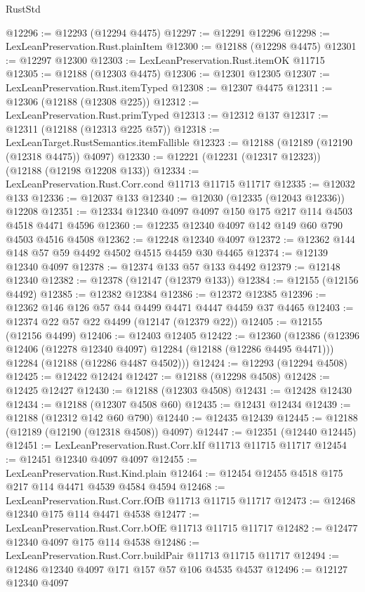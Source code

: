 \begin{lexlean}{RustStd}
\begin{coremodule}
{\begin{coremodule}
{{{{{{{{{{{{{{{{{{{{{{{{{{{{{{{{{{{{{{{{{{{{{{{{{{{{{{{{{{{{{{{{{{{{@12296 := @12293 (@12294 @4475)
@12297 := @12291 @12296
@12298 := LexLeanPreservation.Rust.plainItem
@12300 := @12188 (@12298 @4475)
@12301 := @12297 @12300
@12303 := LexLeanPreservation.Rust.itemOK @11715
@12305 := @12188 (@12303 @4475)
@12306 := @12301 @12305
@12307 := LexLeanPreservation.Rust.itemTyped
@12308 := @12307 @4475
@12311 := @12306 (@12188 (@12308 @225))
@12312 := LexLeanPreservation.Rust.primTyped
@12313 := @12312 @137
@12317 := @12311 (@12188 (@12313 @225 @57))
@12318 := LexLeanTarget.RustSemantics.itemFallible
@12323 := @12188 (@12189 (@12190 (@12318 @4475)) @4097)
@12330 := @12221 (@12231 (@12317 @12323)) (@12188 (@12198 @12208 @133))
@12334 := LexLeanPreservation.Rust.Corr.cond @11713 @11715 @11717
@12335 := @12032 @133
@12336 := @12037 @133
@12340 := @12030 (@12335 (@12043 @12336)) @12208
@12351 := @12334 @12340 @4097 @4097 @150 @175 @217 @114 @4503 @4518 @4471 @4596
@12360 := @12235 @12340 @4097 @142 @149 @60 @790 @4503 @4516 @4508
@12362 := @12248 @12340 @4097
@12372 := @12362 @144 @148 @57 @59 @4492 @4502 @4515 @4459 @30 @4465
@12374 := @12139 @12340 @4097
@12378 := @12374 @133 @57 @133 @4492
@12379 := @12148 @12340
@12382 := @12378 (@12147 (@12379 @133))
@12384 := @12155 (@12156 @4492)
@12385 := @12382 @12384
@12386 := @12372 @12385
@12396 := @12362 @146 @126 @57 @44 @4499 @4471 @4447 @4459 @37 @4465
@12403 := @12374 @22 @57 @22 @4499 (@12147 (@12379 @22))
@12405 := @12155 (@12156 @4499)
@12406 := @12403 @12405
@12422 := @12360
    (@12386
      (@12396 @12406 (@12278 @12340 @4097) @12284 (@12188 (@12286 @4495 @4471)))
      @12284
      (@12188 (@12286 @4487 @4502)))
@12424 := @12293 (@12294 @4508)
@12425 := @12422 @12424
@12427 := @12188 (@12298 @4508)
@12428 := @12425 @12427
@12430 := @12188 (@12303 @4508)
@12431 := @12428 @12430
@12434 := @12188 (@12307 @4508 @60)
@12435 := @12431 @12434
@12439 := @12188 (@12312 @142 @60 @790)
@12440 := @12435 @12439
@12445 := @12188 (@12189 (@12190 (@12318 @4508)) @4097)
@12447 := @12351 (@12440 @12445)
@12451 := LexLeanPreservation.Rust.Corr.kIf @11713 @11715 @11717
@12454 := @12451 @12340 @4097 @4097
@12455 := LexLeanPreservation.Rust.Kind.plain
@12464 := @12454 @12455 @4518 @175 @217 @114 @4471 @4539 @4584 @4594
@12468 := LexLeanPreservation.Rust.Corr.fOfB @11713 @11715 @11717
@12473 := @12468 @12340 @175 @114 @4471 @4538
@12477 := LexLeanPreservation.Rust.Corr.bOfE @11713 @11715 @11717
@12482 := @12477 @12340 @4097 @175 @114 @4538
@12486 := LexLeanPreservation.Rust.Corr.buildPair @11713 @11715 @11717
@12494 := @12486 @12340 @4097 @171 @157 @57 @106 @4535 @4537
@12496 := @12127 @12340 @4097
}}}}}}}}}}}}}}}}}}}}}}}}}}}}}}}}}}}}}}}}}}}}}}}}}}}}}}}}}}}}}}}}}}}}
\end{coremodule}}
\end{coremodule}
\end{lexlean}
